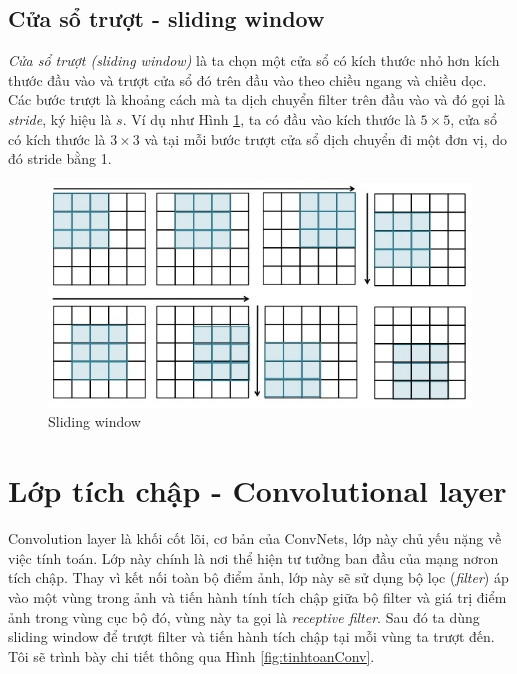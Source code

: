 \subsection{Cửa sổ trượt - sliding window}
\textit{Cửa sổ trượt (sliding window)} là ta chọn một cửa sổ có kích thước nhỏ hơn kích thước đầu vào và trượt cửa sổ đó trên đầu vào theo chiều ngang và chiều dọc. Các bước trượt là khoảng cách mà ta dịch chuyển filter trên đầu vào và đó gọi là \textit{stride}, ký hiệu là $s$. Ví dụ như Hình \ref{fig:slidingwindow}, ta có đầu vào kích thước là $5\times5$, cửa sổ có kích thước là $3\times3$ và tại mỗi bước trượt cửa sổ dịch chuyển đi một đơn vị, do đó stride bằng 1.
\begin{center}
\begin{figure}[htp]
	\begin{center}
		\includegraphics[scale=1]{chap4/image/slidingwindow.jpg}
	\end{center}
	\caption{Sliding window}
	\label{fig:slidingwindow}
\end{figure}
\end{center}

\section{Lớp tích chập - Convolutional layer}
Convolution layer là khối cốt lõi, cơ bản của ConvNets, lớp này chủ yếu nặng về việc tính toán. Lớp này chính là nơi thể hiện tư tưởng ban đầu của mạng nơron tích chập. Thay vì kết nối toàn bộ điểm ảnh, lớp này sẽ sử dụng bộ lọc (\textit{filter}) áp vào một vùng trong ảnh và tiến hành tính tích chập giữa bộ filter và giá trị điểm ảnh trong vùng cục bộ đó,  vùng này ta gọi là \textit{receptive filter}. Sau đó ta dùng sliding window để trượt filter và tiến hành tích chập tại mỗi vùng ta trượt đến. Tôi sẽ trình bày chi tiết thông qua Hình  \ref{fig:tinhtoanConv}.


